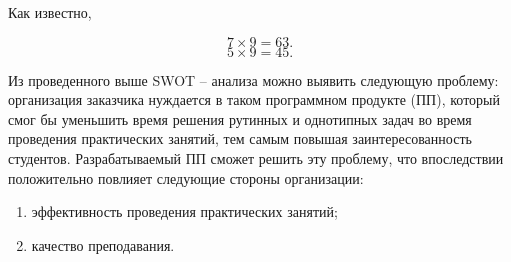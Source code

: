 Как известно,

\begin{equation}
\label{trivial}
7\times9=63.
\end{equation}
\begin{equation}
\label{trivial}
5\times9=45.
\end{equation}

Из проведенного выше SWOT – анализа можно выявить следующую проблему: организация заказчика нуждается в таком программном продукте (ПП), который смог бы уменьшить время решения рутинных и однотипных задач во время проведения практических занятий, тем самым повышая заинтересованность студентов. Разрабатываемый ПП сможет решить эту проблему, что впоследствии положительно повлияет следующие стороны организации:
\begin{enumerate}
	\gostEnum
	\item эффективность проведения практических занятий;
	\item качество преподавания.
\end{enumerate}



